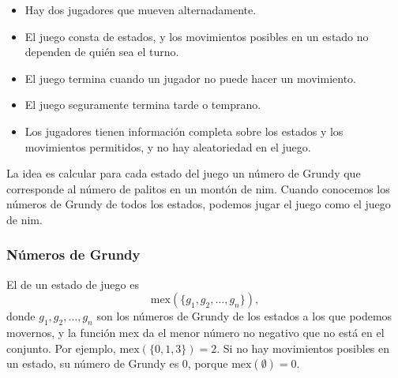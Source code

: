 \begin{itemize}[noitemsep]
\item Hay dos jugadores que mueven alternadamente.
\item El juego consta de estados, y los movimientos posibles
en un estado no dependen de quién sea el turno.
\item El juego termina cuando un jugador no puede hacer un movimiento.
\item El juego seguramente termina tarde o temprano.
\item Los jugadores tienen información completa sobre
los estados y los movimientos permitidos, y no hay aleatoriedad en el juego.
\end{itemize}
La idea es calcular para cada estado del juego
un número de Grundy que corresponde al número de
palitos en un montón de nim.
Cuando conocemos los números de Grundy de todos los estados,
podemos jugar el juego como el juego de nim.

\subsubsection{Números de Grundy}


El  de un estado de juego es
\[\textrm{mex}(\{g_1,g_2,\ldots,g_n\}),\]
donde $g_1,g_2,\ldots,g_n$ son los números de Grundy de los
estados a los que podemos movernos,
y la función mex da el menor
número no negativo que no está en el conjunto.
Por ejemplo, $\textrm{mex}(\{0,1,3\})=2$.
Si no hay movimientos posibles en un estado,
su número de Grundy es 0, porque
$\textrm{mex}(\emptyset)=0$.

